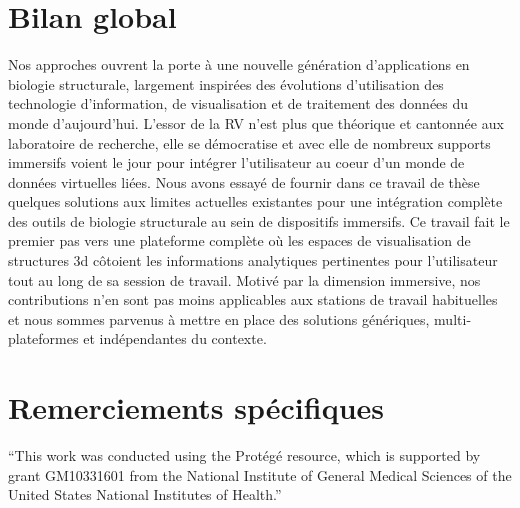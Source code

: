 \section*{Bilan global}

Nos approches ouvrent la porte à une nouvelle génération d'applications en biologie structurale, largement inspirées des évolutions d'utilisation des technologie d'information, de visualisation et de traitement des données du monde d'aujourd'hui. L'essor de la RV n'est plus que théorique et cantonnée aux laboratoire de recherche, elle se démocratise et avec elle de nombreux supports immersifs voient le jour pour intégrer l'utilisateur au coeur d'un monde de données virtuelles liées. Nous avons essayé de fournir dans ce travail de thèse quelques solutions aux limites actuelles existantes pour une intégration complète des outils de biologie structurale au sein de dispositifs immersifs. Ce travail fait le premier pas vers une plateforme complète où les espaces de visualisation de structures 3d côtoient les informations analytiques pertinentes pour l'utilisateur tout au long de sa session de travail. Motivé par la dimension immersive, nos contributions n'en sont pas moins applicables aux stations de travail habituelles et nous sommes parvenus à mettre en place des solutions génériques, multi-plateformes et indépendantes du contexte.

\section*{Remerciements spécifiques}

“This work was conducted using the Protégé resource, which is supported by grant GM10331601 from the National Institute of General Medical Sciences of the United States National Institutes of Health.” 